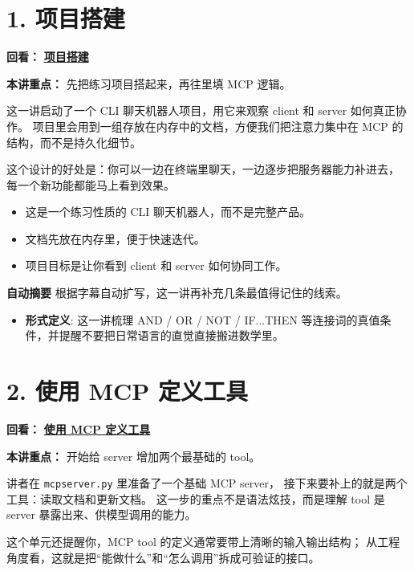 \documentclass[UTF8,a4paper,11pt]{ctexart}
\newcommand{\videolink}[2]{%
  \href{#1}{\textcolor{videoblue}{\textbf{#2}}}%
}
\begin{document}
\section*{1. 项目搭建}
\noindent\textbf{回看：}\videolink{https://www.coursera.org/learn/introduction-to-model-context-protocol/home/module/2}{项目搭建}

\textbf{本讲重点：} 先把练习项目搭起来，再往里填 MCP 逻辑。

这一讲启动了一个 CLI 聊天机器人项目，用它来观察 client 和 server 如何真正协作。
项目里会用到一组存放在内存中的文档，方便我们把注意力集中在 MCP 的结构，而不是持久化细节。

这个设计的好处是：你可以一边在终端里聊天，一边逐步把服务器能力补进去，
每一个新功能都能马上看到效果。

\begin{itemize}
  \item 这是一个练习性质的 CLI 聊天机器人，而不是完整产品。
  \item 文档先放在内存里，便于快速迭代。
  \item 项目目标是让你看到 client 和 server 如何协同工作。
\end{itemize}

\begin{keyconcept}
\textbf{自动摘要}
根据字幕自动扩写，这一讲再补充几条最值得记住的线索。
\begin{itemize}
  \item \textbf{形式定义}: 这一讲梳理 AND / OR / NOT / IF...THEN 等连接词的真值条件，并提醒不要把日常语言的直觉直接搬进数学里。
\end{itemize}
\end{keyconcept}

\section*{2. 使用 MCP 定义工具}
\noindent\textbf{回看：}\videolink{https://www.coursera.org/learn/introduction-to-model-context-protocol/home/module/2}{使用 MCP 定义工具}

\textbf{本讲重点：} 开始给 server 增加两个最基础的 tool。

讲者在 \texttt{mcpserver.py} 里准备了一个基础 MCP server，
接下来要补上的就是两个工具：读取文档和更新文档。
这一步的重点不是语法炫技，而是理解 tool 是 server 暴露出来、供模型调用的能力。

这个单元还提醒你，MCP tool 的定义通常要带上清晰的输入输出结构；
从工程角度看，这就是把“能做什么”和“怎么调用”拆成可验证的接口。
\end{document}
